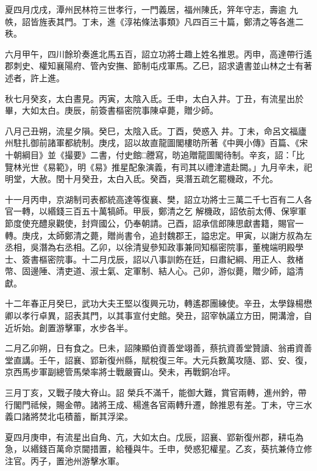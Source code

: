 \begin{pinyinscope}
 夏四月戊戌，潭州民林符三世孝行，一門義居，福州陳氏，笄年守志，壽逾
 九帙，詔皆旌表其門。丁未，進《淳祐條法事類》凡四百三十篇，鄭清之等各進二秩。



 六月甲午，四川餘玠奏進北馬五百，詔立功將士趣上姓名推恩。丙申，高達帶行遙郡刺史、權知襄陽府、管內安撫、節制屯戍軍馬。乙巳，詔求遺書並山林之士有著述者，許上進。



 秋七月癸亥，太白晝見。丙寅，太陰入氐。壬申，太白入井。丁丑，有流星出於畢，大如太白。庚辰，前簽書樞密院事陳卓薨，贈少師。



 八月己丑朔，流星夕隕。癸巳，太陰入氐。丁酉，熒惑入
 井。丁未，命呂文福廬州駐扎御前諸軍都統制。庚戌，詔以故直龍圖閣樓昉所著《中興小傳》百篇、《宋十朝綱目》並《撮要》二書，付史館□謄寫，昉追贈龍圖閣待制。辛亥，詔：「比覽林光世《易範》，明《易》推星配象演義，有司其以禮津遣赴闕。」九月辛未，祀明堂，大赦。閏十月癸丑，太白入氐。癸酉，吳潛五疏乞罷機政，不允。



 十一月丙申，京湖制司表都統高達等復襄、樊，詔立功將士三萬二千七百有二人各官一轉，以緡錢三百五十萬犒師。甲辰，鄭清之乞
 解機政，詔依前太傅、保寧軍節度使充醴泉觀使，封齊國公，仍奉朝請。己酉，詔承信郎陳思獻書籍，賜官一轉。庚戌，太師鄭清之薨，贈尚書令，追封魏郡王，謚忠定。甲寅，以謝方叔為左丞相，吳潛為右丞相。乙卯，以徐清叟參知政事兼同知樞密院事，董槐端明殿學士、簽書樞密院事。十二月戊辰，詔以八事訓飭在廷，曰肅紀綱、用正人、救楮幣、固邊陲、清吏道、淑士氣、定軍制、結人心。己卯，游似薨，贈少師，謚清獻。



 十二年春正月癸巳，武功大夫王堅以復興元功，轉遙郡團練使。辛丑，太學錄楊懋卿以孝行卓異，詔表其門，以其事宣付史館。癸丑，詔宰執議立方田，開溝澮，自近圻始。創置游擊軍，水步各半。



 二月乙卯朔，日有食之。巳未，詔陳顯伯資善堂翊善，蔡抗資善堂贊讀、翁甫資善堂直講。壬午，詔襄、郢新復州縣，賦稅復三年。大元兵數萬攻隨、郢、安、復，京西馬步軍副總管馬榮率將士戰嚴竇山。癸未，再戰銅冶坪。



 三月丁亥，又戰子陵大脊山。詔
 榮兵不滿千，能御大難，賞官兩轉，進州鈐，帶行閣門祗候，賜金帶。諸將王成、楊進各官兩轉升遷，餘推恩有差。丁未，守三水義口諸將焚北屯積蓄，斷其浮梁。



 夏四月庚申，有流星出自角、亢，大如太白。戊辰，詔襄、郢新復州郡，耕屯為急，以緡錢百萬命京閫措置，給種與牛。壬申，熒惑犯權星。乙亥，葵抗兼侍立修注官。丙子，置池州游擊水軍。




\end{pinyinscope}
